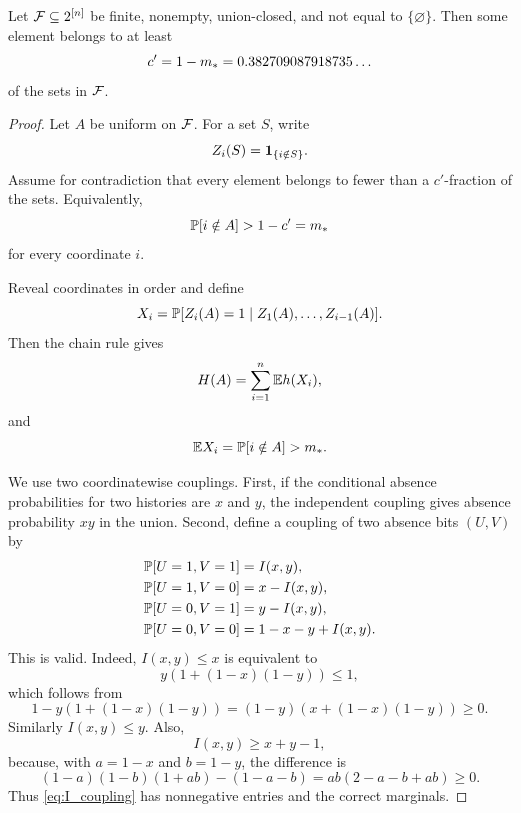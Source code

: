 \begin{corollary}\label{cor:unionclosed}
Let \(\mathcal{F}\subseteq2^{[n]}\) be finite, nonempty, union-closed, and not equal to \(\{\varnothing\}\).  Then some element belongs to at least
\begin{equation}\label{eq:cstar_cor}
  c'=1-m_*=0.382709087918735\ldots
\end{equation}
of the sets in \(\mathcal{F}\).
\end{corollary}

\begin{proof}
Let \(A\) be uniform on \(\mathcal{F}\).  For a set \(S\), write
\begin{equation}\label{eq:Zi_def}
  Z_i(S)=\mathbf{1}_{\{i\notin S\}}.
\end{equation}
Assume for contradiction that every element belongs to fewer than a \(c'\)-fraction of the sets.  Equivalently,
\begin{equation}\label{eq:absence_mean}
  \mathbb{P}[i\notin A]>1-c'=m_*
\end{equation}
for every coordinate \(i\).

Reveal coordinates in order and define
\begin{equation}\label{eq:Xi_def}
  X_i=\mathbb{P}[Z_i(A)=1\mid Z_1(A),\ldots,Z_{i-1}(A)].
\end{equation}
Then the chain rule gives
\begin{equation}\label{eq:chain_A}
  H(A)=\sum_{i=1}^n \mathbb{E} h(X_i),
\end{equation}
and
\begin{equation}\label{eq:EXi}
  \mathbb{E} X_i=\mathbb{P}[i\notin A]>m_*.
\end{equation}

We use two coordinatewise couplings.  First, if the conditional absence probabilities for two histories are \(x\) and \(y\), the independent coupling gives absence probability \(xy\) in the union.  Second, define a coupling of two absence bits \((U,V)\) by
\begin{align}\label{eq:I_coupling}
  \mathbb{P}[U=1,V=1]&=I(x,y),\notag\\
  \mathbb{P}[U=1,V=0]&=x-I(x,y),\notag\\
  \mathbb{P}[U=0,V=1]&=y-I(x,y),\notag\\
  \mathbb{P}[U=0,V=0]&=1-x-y+I(x,y).
\end{align}
This is valid.  Indeed, \(I(x,y)\le x\) is equivalent to
\begin{equation}\label{eq:I_le_x}
  y(1+(1-x)(1-y))\le1,
\end{equation}
which follows from
\begin{equation}\label{eq:I_le_x_diff}
  1-y(1+(1-x)(1-y))=(1-y)(x+(1-x)(1-y))\ge0.
\end{equation}
Similarly \(I(x,y)\le y\).  Also,
\begin{equation}\label{eq:Frechet}
  I(x,y)\ge x+y-1,
\end{equation}
because, with \(a=1-x\) and \(b=1-y\), the difference is
\begin{equation}\label{eq:Frechet_diff}
  (1-a)(1-b)(1+ab)-(1-a-b)=ab(2-a-b+ab)\ge0.
\end{equation}
Thus \eqref{eq:I_coupling} has nonnegative entries and the correct marginals.


\end{proof}
